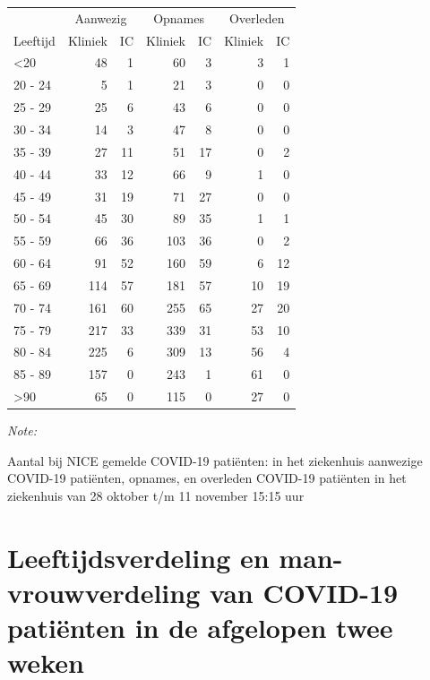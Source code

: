 \documentclass[
  english,
  man,floatsintext]{apa6}
\begin{document}
\begin{table}
\centering\begingroup\fontsize{10}{12}\selectfont

\begin{threeparttable}
\begin{tabular}{lrrrrrr}
\toprule
\multicolumn{1}{c}{ } & \multicolumn{2}{c}{Aanwezig} & \multicolumn{2}{c}{Opnames} & \multicolumn{2}{c}{Overleden} \\
\cmidrule(l{3pt}r{3pt}){2-3} \cmidrule(l{3pt}r{3pt}){4-5} \cmidrule(l{3pt}r{3pt}){6-7}
Leeftijd & Kliniek & IC & Kliniek & IC & Kliniek & IC\\
\midrule
<20 & 48 & 1 & 60 & 3 & 3 & 1\\
20 - 24 & 5 & 1 & 21 & 3 & 0 & 0\\
25 - 29 & 25 & 6 & 43 & 6 & 0 & 0\\
30 - 34 & 14 & 3 & 47 & 8 & 0 & 0\\
35 - 39 & 27 & 11 & 51 & 17 & 0 & 2\\
40 - 44 & 33 & 12 & 66 & 9 & 1 & 0\\
45 - 49 & 31 & 19 & 71 & 27 & 0 & 0\\
50 - 54 & 45 & 30 & 89 & 35 & 1 & 1\\
55 - 59 & 66 & 36 & 103 & 36 & 0 & 2\\
60 - 64 & 91 & 52 & 160 & 59 & 6 & 12\\
65 - 69 & 114 & 57 & 181 & 57 & 10 & 19\\
70 - 74 & 161 & 60 & 255 & 65 & 27 & 20\\
75 - 79 & 217 & 33 & 339 & 31 & 53 & 10\\
80 - 84 & 225 & 6 & 309 & 13 & 56 & 4\\
85 - 89 & 157 & 0 & 243 & 1 & 61 & 0\\
>90 & 65 & 0 & 115 & 0 & 27 & 0\\
\bottomrule
\end{tabular}
\begin{tablenotes}
\item \textit{Note: } 
\item Aantal bij NICE gemelde COVID-19 patiënten: in het ziekenhuis aanwezige COVID-19 patiënten, opnames, en overleden COVID-19 patiënten in het ziekenhuis van 28 oktober t/m 11 november 15:15 uur
\end{tablenotes}
\end{threeparttable}
\endgroup{}
\end{table}

\newpage

\hypertarget{leeftijdsverdeling-en-man-vrouwverdeling-van-covid-19-patiuxebnten-in-de-afgelopen-twee-weken}{%
\section{Leeftijdsverdeling en man-vrouwverdeling van COVID-19 patiënten in de afgelopen twee weken}\label{leeftijdsverdeling-en-man-vrouwverdeling-van-covid-19-patiuxebnten-in-de-afgelopen-twee-weken}}
\end{document}

